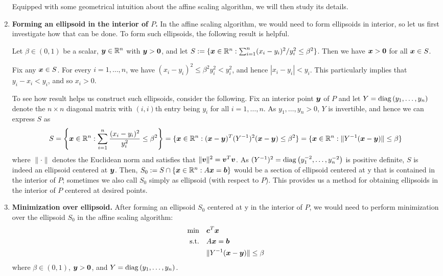 \begin{enumerate}
Equipped with some geometrical intuition about the affine scaling algorithm, we
will then study its details.
\item \textbf{Forming an ellipsoid in the interior of \(P\).} In the affine
scaling algorithm, we would need to form ellipsoids in interior, so let us
first investigate how that can be done. To form such ellipsoids, the following
result is helpful.
\begin{lemma}
\label{lma:form-ellip-interior}
Let \(\beta\in (0,1)\) be a scalar, \(\bm{y}\in\mathbb{R}^{n}\) with \(\bm{y}>\bm{0}\),
and let \(S:=\{\bm{x}\in\mathbb{R}^{n}:\sum_{i=1}^{n}(x_i-y_i)^{2}/y_i^{2}\le\beta^{2}\}\).
Then we have \(\bm{x}>\bm{0}\) for all \(\bm{x}\in S\).
\end{lemma}
\begin{pf}
Fix any \(\bm{x}\in S\). For every \(i=1,\dotsc,n\), we have \((x_i-y_i)^{2}\le\beta^{2}y_i^{2}
<y_i^{2}\), and hence \(|x_i-y_i|<y_i\). This particularly implies that \(y_i-x_i<y_i\),
and so \(x_i>0\).
\end{pf}

To see how result helps us construct such ellipsoids, consider the following.
Fix an interior point \(\bm{y}\) of \(P\) and let \(Y=\operatorname{diag}\left(y_1,\dotsc,y_n\right)\)
denote the \(n\times n\) diagonal matrix with \((i,i)\)th entry being \(y_i\) for all \(i=1,\dotsc,n\). As \(y_1,\dotsc,y_n>0\), \(Y\) is invertible, and hence we can
express \(S\) as
\[
S=\left\{\bm{x}\in\mathbb{R}^{n}:\sum_{i=1}^{n}\frac{(x_i-y_i)^{2}}{y_i^{2}}\le\beta^{2}\right\}
=\{\bm{x}\in\mathbb{R}^{n}:(\bm{x}-\bm{y})^{T}(Y^{-1})^{2}(\bm{x}-\bm{y})\le\beta^{2}\}
=\{\bm{x}\in\mathbb{R}^{n}:\|Y^{-1}(\bm{x}-\bm{y})\|\le\beta\}
\]
where \(\|\cdot\|\) denotes the Euclidean norm and satisfies that
\(\|\bm{v}\|^{2}=\bm{v}^{T}\bm{v}\).  As
\((Y^{-1})^{2}=\operatorname{diag}\left(y_1^{-2},\dotsc,y_n^{-2}\right)\) is positive definite, \(S\) is
indeed an ellipsoid centered at \(\bm{y}\). Then, \(S_0:=S\cap
\{\bm{x}\in\mathbb{R}^{n}:A\bm{x}=\bm{b}\}\) would be a section of ellipsoid
centered at y that is contained in the interior of \(P\); sometimes we also
call \(S_0\) simply as ellipsoid (with respect to \(P\)). This provides us a
method for obtaining ellipsoids in the interior of \(P\) centered at desired
points.
\item \textbf{Minimization over ellipsoid.} After forming an ellipsoid \(S_0\)
centered at y in the interior of \(P\), we would need to perform minimization
over the ellipsoid \(S_0\) in the affine scaling algorithm:
\begin{align*}
\text{min}\quad&\bm{c}^{T}\bm{x} \\
\text{s.t.}\quad&A\bm{x}=\bm{b} \\
&\|Y^{-1}(\bm{x}-\bm{y})\|\le\beta
\end{align*}
where \(\beta\in (0,1)\), \(\bm{y}>\bm{0}\), and \(Y=\operatorname{diag}\left(y_1,\dotsc,y_n\right)\).


\end{enumerate}
